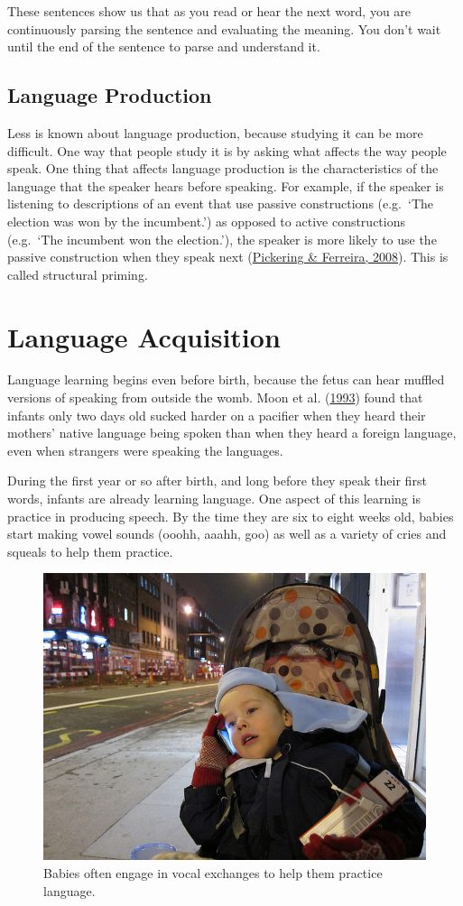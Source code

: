 \documentclass[
]{krantz}
\begin{document}
These sentences show us that as you read or hear the next word, you are continuously parsing the sentence and evaluating the meaning. You don't wait until the end of the sentence to parse and understand it.

\hypertarget{language-production}{%
\subsection*{Language Production}\label{language-production}}


Less is known about language production, because studying it can be more difficult. One way that people study it is by asking what affects the way people speak. One thing that affects language production is the characteristics of the language that the speaker hears before speaking. For example, if the speaker is listening to descriptions of an event that use passive constructions (e.g.~`The election was won by the incumbent.') as opposed to active constructions (e.g.~`The incumbent won the election.'), the speaker is more likely to use the passive construction when they speak next (\protect\hyperlink{ref-pickering2008}{Pickering \& Ferreira, 2008}). This is called structural priming.

\hypertarget{language-acquisition}{%
\section{Language Acquisition}\label{language-acquisition}}

Language learning begins even before birth, because the fetus can hear muffled versions of speaking from outside the womb. Moon et al. (\protect\hyperlink{ref-Moon1993}{1993}) found that infants only two days old sucked harder on a pacifier when they heard their mothers' native language being spoken than when they heard a foreign language, even when strangers were speaking the languages.

During the first year or so after birth, and long before they speak their first words, infants are already learning language. One aspect of this learning is practice in producing speech. By the time they are six to eight weeks old, babies start making vowel sounds (ooohh, aaahh, goo) as well as a variety of cries and squeals to help them practice.

\begin{figure}

{\centering \includegraphics[width=0.4\linewidth]{images/ch8/fig2} 

}

\caption{Babies often engage in vocal exchanges to help them practice language.}\label{fig:practicing}
\end{figure}
\end{document}
